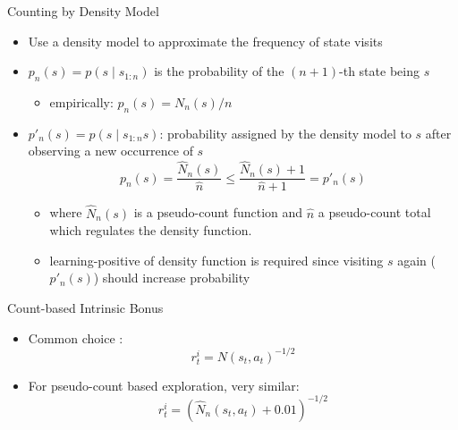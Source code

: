 \documentclass[aspectratio=169]{../latex_main/tntbeamer}  %
\begin{document}
\begin{frame}[c]{Counting by Density Model~}
	
	\begin{itemize}
		\item Use a density model to approximate the frequency of state visits
		\item $p_n(s) = p(s \mid s_{1:n})$ is the probability of the $(n+1)$-th state being $s$
		\begin{itemize}
			\item empirically: $p_n(s) = N_n(s) / n$
		\end{itemize}
		\item $p'_n(s) = p(s \mid s_{1:n} s)$: probability assigned by the density model to $s$ after observing a new occurrence of $s$
		$$p_n(s) =  \frac{\hat{N}_n(s)}{\hat{n}} \leq \frac{\hat{N}_n(s) + 1}{\hat{n} + 1} = p'_n(s)$$
		\begin{itemize}
			\item where $\hat{N}_n(s)$ is a pseudo-count function and $\hat{n}$ a pseudo-count total which regulates the density function.
			\item learning-positive of density function is required since visiting $s$ again ($p'_n(s)$) should increase probability
		\end{itemize}
	\end{itemize}
	
\end{frame}
\begin{frame}[c]{Count-based Intrinsic Bonus}
	
	\begin{itemize}
		\item Common choice :
		$$r_t^i = N(s_t, a_t)^{-1/2}$$
		\item For pseudo-count based exploration, very similar:
		$$r_t^i = (\hat{N}_n (s_t, a_t) + 0.01)^{-1/2} $$
	\end{itemize}
	
\end{frame}
\end{document}
